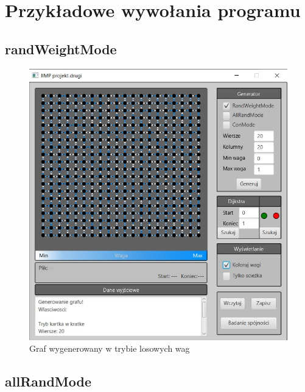 \documentclass{article}
\begin{document}
\pagebreak


\section{Przykładowe wywołania programu}



\subsection {randWeightMode}

 \begin{figure}[htp]
\centering
\includegraphics[width=1\textwidth]{Screenshot_582.jpg}
\caption{\label{fig:mod}Graf wygenerowany w trybie losowych wag}
\end{figure}
\pagebreak
 
 


\subsection{allRandMode}
\end{document}

